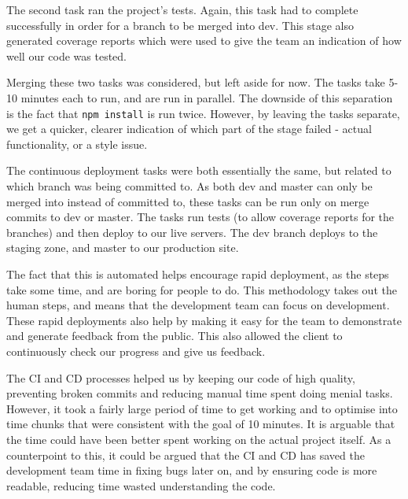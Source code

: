 \documentclass{l3proj}
\begin{document}
The second task ran the project's tests. Again, this task had to complete successfully in
 order for a branch to be merged into dev. This stage also generated coverage reports which
 were used to give the team an indication of how well our code was tested.

 

Merging these two tasks was considered, but left aside for now. The tasks take 5-10 minutes
 each to run, and are run in parallel. The downside of this separation is the fact that \texttt{npm install}
 is run twice. However, by leaving the tasks separate, we get a quicker, clearer indication
 of which part of the stage failed - actual functionality, or a style issue.

 

The continuous deployment tasks were both essentially the same, but related to which branch was being
 committed to. As both dev and master can only be merged into instead of committed to, these tasks can
 be run only on merge commits to dev or master. The tasks run tests (to allow coverage reports for the branches)
 and then deploy to our live servers. The dev branch deploys to the staging zone, and
 master to our production site.

The fact that this is automated helps encourage rapid deployment, as the steps take some time, and are
 boring for people to do. This methodology takes out the human steps, and means that the development team
 can focus on development. These rapid deployments also help by making it easy for the team to demonstrate
 and generate feedback from the public. This also allowed the client to continuously check our progress and
 give us feedback.


The CI and CD processes helped us by keeping our code of high quality, preventing broken commits and reducing
 manual time spent doing menial tasks. However, it took a fairly large period of time to get working and to
 optimise into time chunks that were consistent with the goal of 10 minutes. It is arguable that the time
 could have been better spent working on the actual project itself. As a counterpoint to this, it could be
 argued that the CI and CD has saved the development team time in fixing bugs later on, and by ensuring code is more
 readable, reducing time wasted understanding the code.
\end{document}
